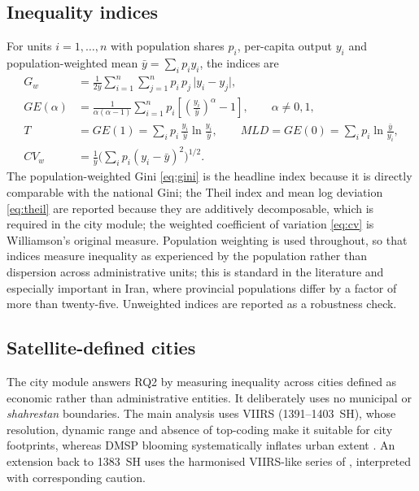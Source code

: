 \documentclass[11pt,a4paper]{article}
\begin{document}
\subsection{Inequality indices}\label{sec:indices}

For units $i=1,\ldots,n$ with population shares $p_i$, per-capita output $y_i$ and population-weighted mean $\bar y=\sum_i p_i y_i$, the indices are
\begin{align}
G_w &= \frac{1}{2\bar y}\sum_{i=1}^{n}\sum_{j=1}^{n}p_i\,p_j\,\lvert y_i-y_j\rvert, \label{eq:gini}\\
GE(\alpha) &= \frac{1}{\alpha(\alpha-1)}\sum_{i=1}^{n}p_i\left[\left(\frac{y_i}{\bar y}\right)^{\alpha}-1\right],\qquad \alpha\neq 0,1, \label{eq:ge}\\
T &= GE(1)=\sum_{i}p_i\,\frac{y_i}{\bar y}\ln\frac{y_i}{\bar y},\qquad
MLD = GE(0)=\sum_{i}p_i\ln\frac{\bar y}{y_i}, \label{eq:theil}\\
CV_w &= \frac{1}{\bar y}\Big(\sum_i p_i (y_i-\bar y)^2\Big)^{1/2}. \label{eq:cv}
\end{align}
The population-weighted Gini \eqref{eq:gini} is the headline index because it is directly comparable with the national Gini; the Theil index and mean log deviation \eqref{eq:theil} are reported because they are additively decomposable, which is required in the city module; the weighted coefficient of variation \eqref{eq:cv} is Williamson's original measure. Population weighting is used throughout, so that indices measure inequality as experienced by the population rather than dispersion across administrative units; this is standard in the literature \citep{LessmannSeidel2017} and especially important in Iran, where provincial populations differ by a factor of more than twenty-five. Unweighted indices are reported as a robustness check.

\subsection{Satellite-defined cities}\label{sec:cities}

The city module answers RQ2 by measuring inequality across cities defined as economic rather than administrative entities. It deliberately uses no municipal or \emph{shahrestan} boundaries. The main analysis uses VIIRS (1391--1403~SH), whose resolution, dynamic range and absence of top-coding make it suitable for city footprints, whereas DMSP blooming systematically inflates urban extent \citep{Small2005,Gibson2025}. An extension back to 1383~SH uses the harmonised VIIRS-like series of \citet{ChenZ2021}, interpreted with corresponding caution.
\end{document}
